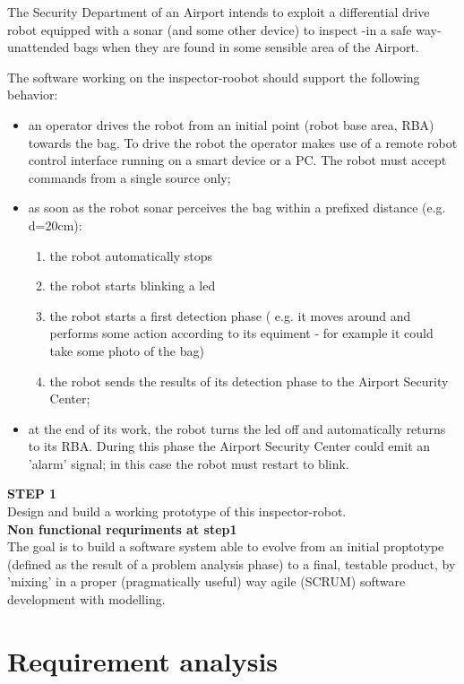\documentclass{llncs}
\newcommand{\labelsec}[1]{\label{sec:#1}}
\begin{document}
The Security Department of an Airport intends to exploit a differential drive robot equipped with a sonar (and some other device) to inspect -in a safe way- unattended bags when they are found in some sensible area of the Airport.
 
The software working on the inspector-roobot should support the following behavior:
\begin{itemize}
\item an operator drives the robot from an initial point (robot base area, RBA) towards the bag. To drive the robot the operator makes use of a remote robot control interface running on a smart device or a PC. The robot must accept commands from a single source only;
\item as soon as the robot sonar perceives the bag within a prefixed distance (e.g. d=20cm):
\begin{enumerate}
\item the robot automatically stops
\item the robot starts blinking a led
\item the robot starts a first detection phase ( e.g. it moves around and performs some action according to its equiment - for example it could take some photo of the bag)
\item the robot sends the results of its detection phase to the Airport Security Center;
\end{enumerate}
\item at the end of its work, the robot turns the led off and automatically returns to its RBA. During this phase the Airport Security Center could emit an 'alarm' signal; in this case the robot must restart to blink.
\end{itemize} 
\textbf{STEP 1}\\
Design and build a working prototype of this inspector-robot.\\
\textbf{Non functional requriments at step1}\\
The goal is to build a software system able to evolve from an initial proptotype (defined as the result of a problem analysis phase) to a final, testable product, by 'mixing' in a proper (pragmatically useful) way agile (SCRUM) software development with modelling.
\section{Requirement analysis}
\labelsec{ReqAnalysis}
\end{document}
